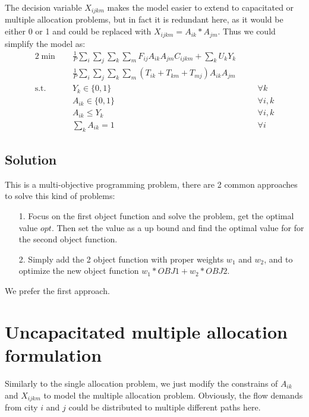 \documentclass{llncs}
\begin{document}
The decision variable $X_{ijkm}$ makes the model easier to extend to capacitated or multiple allocation problems, but in fact it is redundant here, as it would be either 0 or 1 and could be replaced with $X_{ijkm} = A_{ik} * A_{jm}$. Thus we could simplify the model as:
	\begin{alignat}{2}
		\min\quad
		& \frac{1}{P} \sum_{i}\sum_{j}\sum_{k}\sum_{m}F_{ij}  A_{ik} A_{jm} C_{ijkm} + \sum_{k}U_k Y_{k} & & \nonumber\\
		\quad& \frac{1}{P} \sum_{i}\sum_{j}\sum_{k}\sum_{m}{(T_{ik}+ T_{km}+ T_{mj} ) A_{ik} A_{jm}}  & & \tag{LP2} \label{lp2}\\
		\mbox{s.t.}  \quad
		&Y_{k} \in \{0,1\} &\quad& \forall k \label{st1.1}\\ 
		&A_{ik} \in \{0,1\} &\quad& \forall i,k \label{st1.2}\\ 
		&A_{ik} \leq Y_{k} &\quad& \forall i,k \label{st1.3}\\
		&\sum_{k}{A_{ik}} = 1 &\quad& \forall i \label{st1.4}
	\end{alignat}


\subsection{Solution}

	This is a multi-objective programming problem, there are 2 common approaches to solve this kind of problems:
	\begin{itemize}
		\item[1.] Focus on the first object function and solve the problem, get the optimal value $opt$. Then set the value as a up bound and find the optimal value for for the second object function.
		\item[2.] Simply add the 2 object function with proper weights $w_1$ and $w_2$, and to optimize the new object function $w_1*OBJ1+w_2*OBJ2$.
	\end{itemize}
	
	We prefer the first approach.
	
\section{Uncapacitated multiple allocation formulation}
	Similarly to the single allocation problem, we just modify the constrains of $A_{ik}$ and $X_{ijkm}$ to model the multiple allocation problem. Obviously, the flow demands from city $i$ and $j$ could be distributed to multiple different paths here.
	
\end{document}
